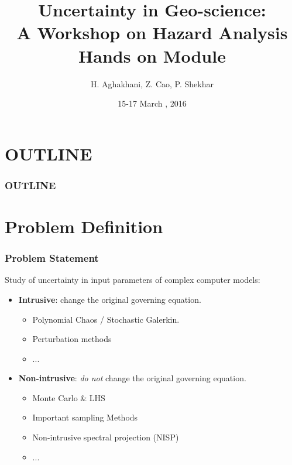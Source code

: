 \documentclass[10pt]{beamer}
\begin{document}
\title {\bfseries{\sc Uncertainty in Geo-science:\\ A Workshop on Hazard Analysis \\ {\small Hands on Module} }}
\author { H. Aghakhani, Z. Cao, P. Shekhar}
\date{\small 15-17 March , 2016} 
\begin{frame}
\titlepage
\end{frame}
\section*{OUTLINE}
\begin{frame}
\frametitle{OUTLINE}  
\tableofcontents
\end{frame}

\section{Problem Definition}
\begin{frame}
\frametitle{Problem Statement}
Study of  uncertainty in input parameters of complex computer models: 
\begin{itemize}
    \item  {\bf Intrusive}: change the original governing equation.
    \begin{itemize}
        \item Polynomial Chaos / Stochastic Galerkin.
        \item Perturbation methods
        \item ...
    \end{itemize}
    \item  {\bf Non-intrusive}: \textit{ do not} change the original governing equation.
    \begin{itemize}
        \item Monte Carlo \& LHS
        \item Important sampling Methods
        \item Non-intrusive spectral projection (NISP)
        \item ...
    \end{itemize}
\end{itemize}
\end{frame}
\end{document}
